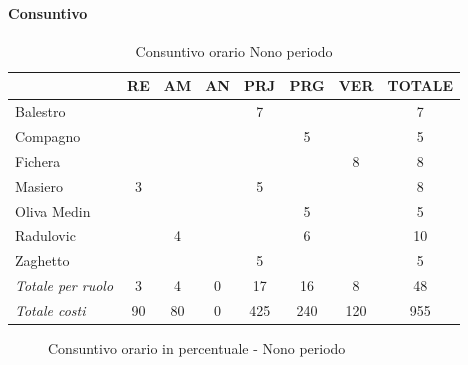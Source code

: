 \documentclass[a4paper,12pt]{article}
\begin{document}
            \paragraph{Consuntivo}
                \begin{table}[H]
                \centering
                \caption{Consuntivo orario Nono periodo}
                \begin{tabular}{|l|c|c|c|c|c|c|c|}
                \hline
                    \rowcolor{lightgray}{\textbf{Membro}} & {\textbf{RE}} & {\textbf{AM}} & {\textbf{AN}} & {\textbf{PRJ}} & {\textbf{PRG}} & {\textbf{VER}} & {\textbf{TOTALE}}\\
                \hline
                    Balestro & & & & 7 & & & 7\\
                \hline
                    Compagno & & & & & 5 & & 5\\
                \hline
                    Fichera & & & & & & 8 & 8\\
                \hline
                    Masiero & 3 & & & 5 & & & 8\\
                \hline
                    Oliva Medin & & & & & 5 & & 5\\
                \hline
                    Radulovic & & 4 & & & 6 & & 10\\
                \hline
                    Zaghetto & & & & 5 & & & 5\\
                \hline
                    \rowcolor{lightgray}\textit{Totale per ruolo} & 3 & 4 & 0 & 17 & 16 & 8 & 48\\
                \hline
                    \rowcolor{lightgray}\textit{Totale costi} & 90 & 80 & 0 & 425 & 240 & 120 & 955\\
                \hline
                \end{tabular}
                \end{table}

                \begin{figure}[H]
                \centering
                \caption{Consuntivo orario in percentuale - Nono periodo}
                \end{figure}
                
\end{document}
